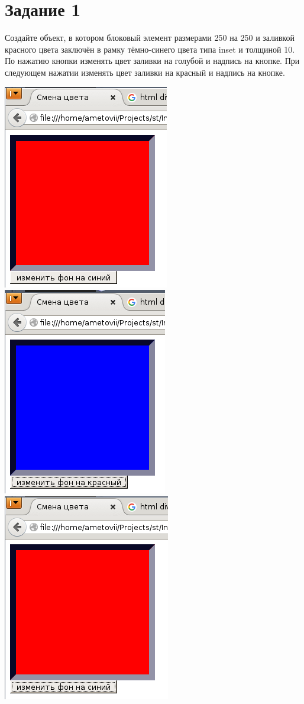 \section{Задание 1}

Создайте объект, в котором блоковый элемент размерами 250 на 250 и заливкой красного цвета заключён в рамку тёмно-синего цвета типа inset и толщиной 10. По нажатию кнопки изменять цвет заливки на голубой и надпись на кнопке. При следующем нажатии изменять цвет заливки на красный и надпись на кнопке.

\begin{center}
  \includegraphics{img/Exercise_01/01.png}
  \includegraphics{img/Exercise_01/02.png}
  \includegraphics{img/Exercise_01/03.png}
\end{center}

